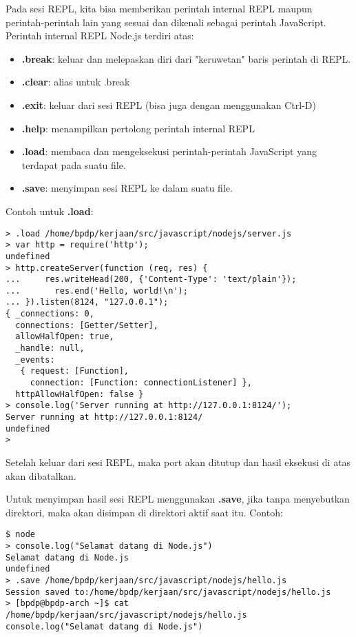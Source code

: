 Pada sesi REPL, kita bisa memberikan perintah internal REPL maupun perintah-perintah lain yang sesuai dan dikenali sebagai perintah JavaScript. Perintah internal REPL Node.js terdiri atas:
\begin{itemize}
  \item \textbf{.break}: keluar dan melepaskan diri dari "keruwetan" baris perintah di REPL.
  \item \textbf{.clear}: alias untuk .break
  \item \textbf{.exit}: keluar dari sesi REPL (bisa juga dengan menggunakan Ctrl-D)
  \item \textbf{.help}: menampilkan pertolong perintah internal REPL
  \item \textbf{.load}: membaca dan mengeksekusi perintah-perintah JavaScript yang terdapat pada suatu file.
  \item \textbf{.save}: menyimpan sesi REPL ke dalam suatu file.
\end{itemize}

Contoh untuk \textbf{.load}:

\lstset{language=JavaScript,caption=Contoh penggunaan .load dalam REPL}
\begin{lstlisting}
> .load /home/bpdp/kerjaan/src/javascript/nodejs/server.js
> var http = require('http');
undefined
> http.createServer(function (req, res) {
...     res.writeHead(200, {'Content-Type': 'text/plain'});
...       res.end('Hello, world!\n');
... }).listen(8124, "127.0.0.1");
{ _connections: 0,
  connections: [Getter/Setter],
  allowHalfOpen: true,
  _handle: null,
  _events: 
   { request: [Function],
     connection: [Function: connectionListener] },
  httpAllowHalfOpen: false }
> console.log('Server running at http://127.0.0.1:8124/');
Server running at http://127.0.0.1:8124/
undefined
>
\end{lstlisting}

Setelah keluar dari sesi REPL, maka port akan ditutup dan hasil eksekusi di atas akan dibatalkan. 

Untuk menyimpan hasil sesi REPL menggunakan \textbf{.save}, jika tanpa menyebutkan direktori, maka akan disimpan di direktori aktif saat itu. Contoh:
\lstset{language=bash,caption=Contoh penggunaan perintah .save di sesi REPL}
\begin{lstlisting}
$ node
> console.log("Selamat datang di Node.js")
Selamat datang di Node.js
undefined
> .save /home/bpdp/kerjaan/src/javascript/nodejs/hello.js
Session saved to:/home/bpdp/kerjaan/src/javascript/nodejs/hello.js
> [bpdp@bpdp-arch ~]$ cat /home/bpdp/kerjaan/src/javascript/nodejs/hello.js 
console.log("Selamat datang di Node.js")
\end{lstlisting}

